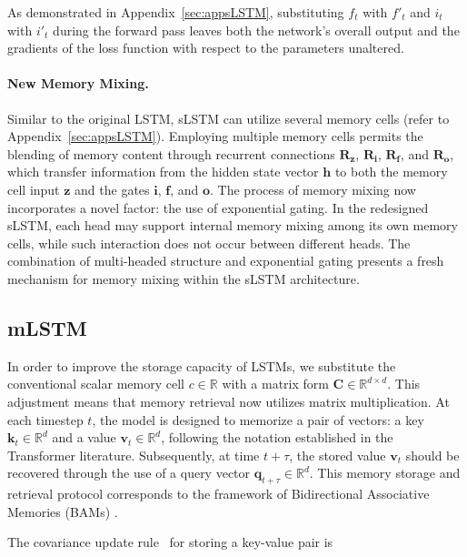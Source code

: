 As demonstrated in Appendix~\ref{sec:appsLSTM}, substituting $f_t$ with $f'_t$ and $i_t$ with $i'_t$ during the forward pass leaves both the network's overall output and the gradients of the loss function with respect to the parameters unaltered.

\paragraph{New Memory Mixing.} Similar to the original LSTM, sLSTM can utilize several memory cells (refer to Appendix~\ref{sec:appsLSTM}). Employing multiple memory cells permits the blending of memory content through recurrent connections $\mathbf{R}_{\mathbf{z}}$, $\mathbf{R}_{\mathbf{i}}$, $\mathbf{R}_{\mathbf{f}}$, and $\mathbf{R}_{\mathbf{o}}$, which transfer information from the hidden state vector $\mathbf{h}$ to both the memory cell input $\mathbf{z}$ and the gates $\mathbf{i}$, $\mathbf{f}$, and $\mathbf{o}$. The process of memory mixing now incorporates a novel factor: the use of exponential gating. In the redesigned sLSTM, each head may support internal memory mixing among its own memory cells, while such interaction does not occur between different heads. The combination of multi-headed structure and exponential gating presents a fresh mechanism for memory mixing within the sLSTM architecture.

\subsection{mLSTM}
\label{sec:mLSTM}

In order to improve the storage capacity of LSTMs, we substitute the conventional scalar memory cell $c \in \mathbb{R}$ with a matrix form $\mathbf{C} \in \mathbb{R}^{d \times d}$. This adjustment means that memory retrieval now utilizes matrix multiplication. At each timestep $t$, the model is designed to memorize a pair of vectors: a key $\mathbf{k}_t \in \mathbb{R}^d$ and a value $\mathbf{v}_t \in \mathbb{R}^d$, following the notation established in the Transformer literature. Subsequently, at time $t+\tau$, the stored value $\mathbf{v}_t$ should be recovered through the use of a query vector $\mathbf{q}_{t+\tau} \in \mathbb{R}^d$. This memory storage and retrieval protocol corresponds to the framework of Bidirectional Associative Memories (BAMs) \citep{Kohonen:72,Anderson:72,Nakano:72,Anderson:77}.

The covariance update rule~\citep{Sejnowski:77,Dayan:91} for storing a key-value pair is

